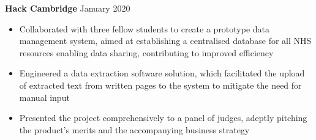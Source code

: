 \documentclass{article}
\begin{document}
\textbf{Hack Cambridge} \hfill January 2020
\begin{itemize}
    \item Collaborated with three fellow students to create a prototype data management system, aimed at establishing a centralised database for all NHS resources enabling data sharing, contributing to improved efficiency
    \item Engineered a data extraction software solution, which facilitated the upload of extracted text from written pages to the system to mitigate the need for manual input
    \item Presented the project comprehensively to a panel of judges, adeptly pitching the product's merits and the accompanying business strategy
\end{itemize} \medskip



\vspace{-0.75\baselineskip}
\hrulefill
\vspace{-0.75\baselineskip}
\end{document}
